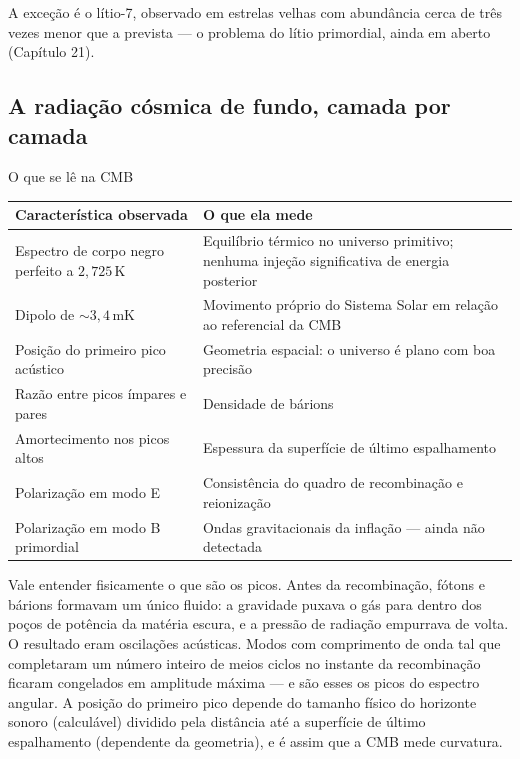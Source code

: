 \documentclass[11pt,a4paper]{article}
\begin{document}
A exceção é o lítio-7, observado em estrelas velhas com abundância cerca de três vezes menor que a prevista --- o problema do lítio primordial, ainda em aberto (Capítulo 21).

\subsection*{A radiação cósmica de fundo, camada por camada}

\begin{lessonblock}{O que se lê na CMB}
\begin{tabular}{>{\raggedright\arraybackslash}p{}>{\raggedright\arraybackslash}p{}}
\toprule
Característica observada & O que ela mede \\
\midrule
Espectro de corpo negro perfeito a $2{,}725\,\mathrm{K}$ & Equilíbrio térmico no universo primitivo; nenhuma injeção significativa de energia posterior \\
Dipolo de $\sim3{,}4\,\mathrm{mK}$ & Movimento próprio do Sistema Solar em relação ao referencial da CMB \\
Posição do primeiro pico acústico & Geometria espacial: o universo é plano com boa precisão \\
Razão entre picos ímpares e pares & Densidade de bárions \\
Amortecimento nos picos altos & Espessura da superfície de último espalhamento \\
Polarização em modo E & Consistência do quadro de recombinação e reionização \\
Polarização em modo B primordial & Ondas gravitacionais da inflação --- ainda não detectada \\
\bottomrule
\end{tabular}
\end{lessonblock}

Vale entender fisicamente o que são os picos. Antes da recombinação, fótons e bárions formavam um único fluido: a gravidade puxava o gás para dentro dos poços de potência da matéria escura, e a pressão de radiação empurrava de volta. O resultado eram oscilações acústicas. Modos com comprimento de onda tal que completaram um número inteiro de meios ciclos no instante da recombinação ficaram congelados em amplitude máxima --- e são esses os picos do espectro angular. A posição do primeiro pico depende do tamanho físico do horizonte sonoro (calculável) dividido pela distância até a superfície de último espalhamento (dependente da geometria), e é assim que a CMB mede curvatura.
\end{document}
